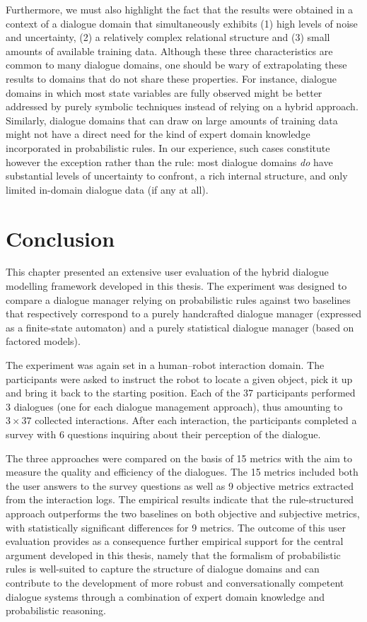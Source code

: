 Furthermore, we must also highlight the fact that the results were obtained in a context of a dialogue domain that simultaneously exhibits (1) high levels of noise and uncertainty, (2) a relatively complex relational structure and (3) small amounts of available training data.  Although these three characteristics are common to many  dialogue domains, one should be wary of extrapolating these results to domains that do not share these properties.  For instance, dialogue domains in which most state variables are fully observed might be better addressed by purely symbolic techniques instead of relying on a hybrid approach. Similarly, dialogue domains that can draw on large amounts of training data might not have a direct need for the kind of expert domain knowledge incorporated in probabilistic rules.   In our experience, such cases constitute however the exception rather than the rule: most dialogue domains \textit{do} have substantial levels of uncertainty to confront, a rich internal structure, and only limited in-domain dialogue data (if any at all).


\section{Conclusion}

This chapter presented an extensive user evaluation of the hybrid dialogue modelling framework developed in this thesis.  The experiment was designed to compare a dialogue manager relying on probabilistic rules against two baselines that respectively correspond to a purely handcrafted dialogue manager (expressed as a finite-state automaton) and a purely statistical dialogue manager (based on factored models). 

The experiment was again set in a human--robot interaction domain.  The participants were asked to instruct the robot to locate a given object, pick it up and bring it back to the starting position.  Each of the 37 participants performed 3 dialogues (one for each dialogue management approach), thus amounting to $3 \times 37$ collected interactions.  After each interaction, the participants completed a survey with 6 questions inquiring about their perception of the dialogue.  

The three approaches were compared on the basis of 15 metrics with the aim to measure the quality and efficiency of the dialogues. The 15 metrics included both the user answers to the survey questions as well as 9 objective metrics extracted from the interaction logs.   The empirical results indicate that the rule-structured approach outperforms the two baselines on both objective and subjective metrics, with statistically significant differences for 9 metrics. The outcome of this user evaluation provides as a consequence further empirical support for the central argument developed in this thesis, namely that the formalism of probabilistic rules is well-suited to capture the structure of dialogue domains and can contribute to the development of more robust and conversationally competent dialogue systems through a combination of expert domain knowledge and probabilistic reasoning. 


